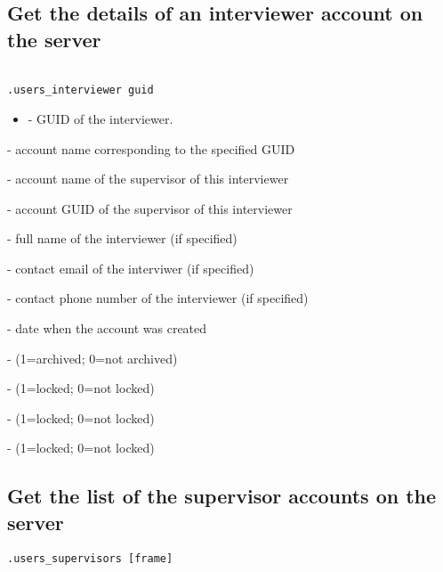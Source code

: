 \subsection{Get the details of an interviewer account on the server}
\begin{lstlisting}[style=CommandLineStyle, showlines=true]

.users_interviewer guid

\end{lstlisting}

\paramsheader
\begin{itemize}
\item {} - GUID of the interviewer.
\end{itemize}

\savedres
\begin{compactitem}
    \item {} - account name corresponding to the specified GUID
    \item {} - account name of the supervisor of this interviewer
    \item {} - account GUID of the supervisor of this interviewer
    \item {} - full name of the interviewer (if specified)
    \item {} - contact email of the interviwer (if specified)
    \item {} - contact phone number of the interviewer (if specified)
    \item {} - date when the account was created
    \item {} - (1=archived; 0=not archived)
    \item {} - (1=locked; 0=not locked)
    \item {} - (1=locked; 0=not locked)
    \item {} - (1=locked; 0=not locked)
\end{compactitem}

\subsection{Get the list of the supervisor accounts on the server}
\begin{lstlisting}[style=CommandLineStyle]
.users_supervisors [frame]
\end{lstlisting}

